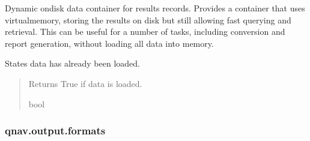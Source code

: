 \documentclass[letterpaper,10pt,english]{sphinxmanual}
\begin{document}
\begin{fulllineitems}
\label{\detokenize{modules/output/data:qnav.output.data.ResultsTable}}
\pysigstartsignatures
{}
\pysigstopsignatures
\sphinxAtStartPar
Dynamic on\sphinxhyphen{}disk data container for results records.
Provides a container that uses virtual\sphinxhyphen{}memory, storing the results on
disk but still allowing fast querying and retrieval. This can be useful
for a number of tasks, including conversion and report generation,
without loading all data into memory.

\begin{fulllineitems}
\label{\detokenize{modules/output/data:qnav.output.data.ResultsTable.is_data_loaded}}
\pysigstartsignatures
{}
\pysigstopsignatures
\sphinxAtStartPar
States data has already been loaded.
\begin{quote}\begin{description}
\sphinxAtStartPar
Returns True if data is loaded.

\sphinxAtStartPar
bool

\end{description}\end{quote}

\end{fulllineitems}


\end{fulllineitems}


\sphinxstepscope


\subsubsection{qnav.output.formats}
\label{\detokenize{modules/output/formats:module-qnav.output.formats}}\label{\detokenize{modules/output/formats:qnav-output-formats}}\label{\detokenize{modules/output/formats::doc}}
\end{document}
